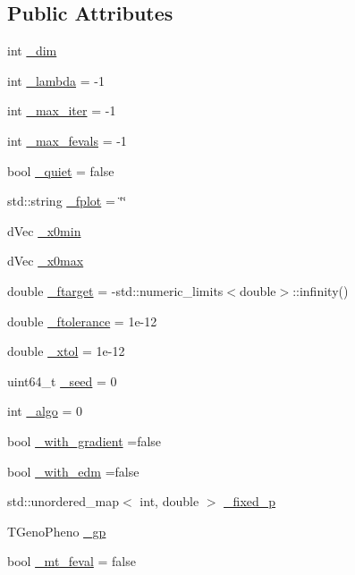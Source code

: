 \subsection*{Public Attributes}
\begin{DoxyCompactItemize}
\item 
int \hyperlink{classlibcmaes_1_1Parameters_affc62ae5c5f1db4f88e4c2dc96387af6}{\-\_\-dim}
\item 
int \hyperlink{classlibcmaes_1_1Parameters_af732f7206f23cbd6ec2bbd4e217a9a2b}{\-\_\-lambda} = -\/1
\item 
int \hyperlink{classlibcmaes_1_1Parameters_a60abfc730c5aa46e42ebd1598b59caa6}{\-\_\-max\-\_\-iter} = -\/1
\item 
int \hyperlink{classlibcmaes_1_1Parameters_ad316488121bd51f62b28e8183d591c9e}{\-\_\-max\-\_\-fevals} = -\/1
\item 
bool \hyperlink{classlibcmaes_1_1Parameters_a6f6dad55c02a23891e3280cad288295a}{\-\_\-quiet} = false
\item 
std\-::string \hyperlink{classlibcmaes_1_1Parameters_aa49511ea00199348ea94f1aa53fe5bc1}{\-\_\-fplot} = \char`\"{}\char`\"{}
\item 
d\-Vec \hyperlink{classlibcmaes_1_1Parameters_aa3bb27467698d9cb7fc7e0a83b48800f}{\-\_\-x0min}
\item 
d\-Vec \hyperlink{classlibcmaes_1_1Parameters_aece9694af9bee78bb13b0994db7ac45e}{\-\_\-x0max}
\item 
double \hyperlink{classlibcmaes_1_1Parameters_a837dbcfba351a043441076a11666f92c}{\-\_\-ftarget} = -\/std\-::numeric\-\_\-limits$<$double$>$\-::infinity()
\item 
double \hyperlink{classlibcmaes_1_1Parameters_ab6c11cc112b5709e9039967e881c808e}{\-\_\-ftolerance} = 1e-\/12
\item 
double \hyperlink{classlibcmaes_1_1Parameters_aaa9e8eedba7d7140d116163b40f653f8}{\-\_\-xtol} = 1e-\/12
\item 
uint64\-\_\-t \hyperlink{classlibcmaes_1_1Parameters_ac6d616c3d5295fec8a0b230592fb767a}{\-\_\-seed} = 0
\item 
int \hyperlink{classlibcmaes_1_1Parameters_a7a5fc681b0c7294ef050ace344f923db}{\-\_\-algo} = 0
\item 
bool \hyperlink{classlibcmaes_1_1Parameters_aff76cebbfef51c20398aab8f49a3676a}{\-\_\-with\-\_\-gradient} =false
\item 
bool \hyperlink{classlibcmaes_1_1Parameters_adbaa11317ae66061e097c372522b8758}{\-\_\-with\-\_\-edm} =false
\item 
std\-::unordered\-\_\-map$<$ int, double $>$ \hyperlink{classlibcmaes_1_1Parameters_a83fdae9d4bb9b77c8ad955c6aac75086}{\-\_\-fixed\-\_\-p}
\item 
T\-Geno\-Pheno \hyperlink{classlibcmaes_1_1Parameters_ab8e153b4785de9358599caa840b94ef2}{\-\_\-gp}
\item 
bool \hyperlink{classlibcmaes_1_1Parameters_a78a3b97b4119776b661c1be4fc283069}{\-\_\-mt\-\_\-feval} = false
\end{DoxyCompactItemize}


